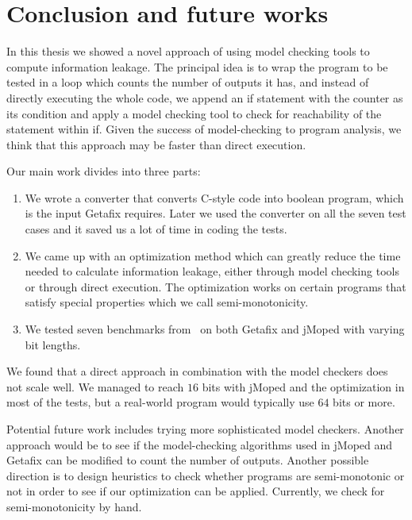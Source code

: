 
\chapter{Conclusion and future works}
	\label{CH_summary}

In this thesis we showed a novel approach of using model checking tools to compute information leakage. The principal idea is to wrap the program to be tested in a loop which counts the number of outputs it has, and instead of directly executing the whole code, we append an if statement with the counter as its condition and apply a model checking tool to check for reachability of the statement within if. Given the success of model-checking to program analysis, we think that this approach may be faster than direct execution.

Our main work divides into three parts:
\begin{enumerate}
\item We wrote a converter that converts C-style code into boolean program, which is the input Getafix requires. Later we used the converter on all the seven test cases and it saved us a lot of time in coding the tests. 
\item We came up with an optimization method which can greatly reduce the time needed to calculate information leakage, either through model checking tools or through direct execution. The optimization works on certain programs that satisfy special properties which we call semi-monotonicity. 

\item We tested seven benchmarks from~\cite{Smith} on both Getafix and jMoped with varying bit lengths.
\end{enumerate}

We found that a direct approach in combination with the model checkers does not scale well. We managed to reach $16$ bits with jMoped and the optimization in most of the tests, but a real-world program would typically use $64$ bits or more. 


Potential future work includes trying more sophisticated model checkers. Another approach would be to see if the model-checking algorithms  used in jMoped and Getafix can be modified to count the number of outputs. Another possible direction is to design heuristics to check whether programs are semi-monotonic or not in order to see if our optimization can be applied. Currently, we check for semi-monotonicity by hand. 